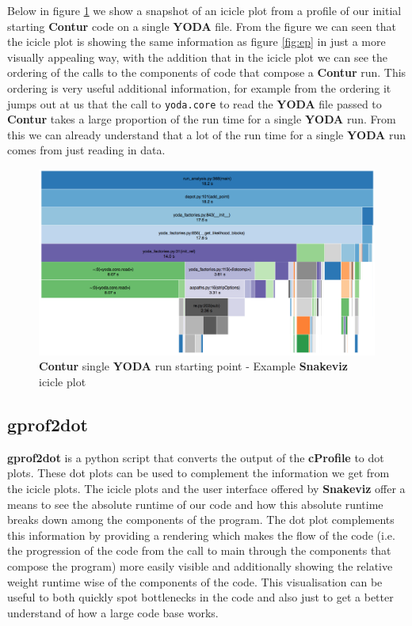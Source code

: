 Below in figure \ref{fig:single_yoda_start_profile_snakeviz} we show a snapshot of an icicle plot from a profile of our initial starting \textbf{Contur} code on a single \textbf{YODA} file. From the figure we can seen that the icicle plot is showing the same information as figure \ref{fig:ep} in just a more visually appealing way, with the addition that in the icicle plot we can see the ordering of the calls to the components of code that compose a \textbf{Contur} run. This ordering is very useful additional information, for example from the ordering it jumps out at us that the call to \texttt{yoda.core} to read the \textbf{YODA} file passed to \textbf{Contur} takes a large proportion of the run time for a single \textbf{YODA} run. From this we can already understand that a lot of the run time for a single \textbf{YODA} run comes from just reading in data. 

\begin{figure}[H]
\centering
\includegraphics[scale=0.3]{plots/initial_single_contur.png}
\caption{\textbf{Contur} single \textbf{YODA} run starting point - Example \textbf{Snakeviz} icicle plot}
\label{fig:single_yoda_start_profile_snakeviz}
\end{figure}

\subsection{gprof2dot}\label{dot_plot}
\textbf{gprof2dot}\cite{gprof2dot} is a python script that converts the output of the \textbf{cProfile} to dot plots. These dot plots can be used to complement the information we get from the icicle plots. The icicle plots and the user interface offered by \textbf{Snakeviz} offer a means to see the absolute runtime of our code and how this absolute runtime breaks down among the components of the program. The dot plot complements this information by providing a rendering which makes the flow of the code (i.e. the progression of the code from the call to main through the components that compose the program) more easily visible and additionally showing the relative weight runtime wise of the components of the code. This visualisation can be useful to both quickly spot bottlenecks in the code and also just to get a better understand of how a large code base works.

